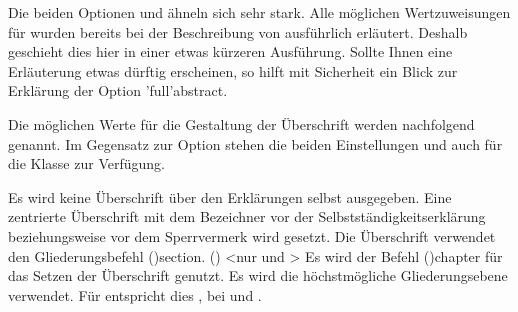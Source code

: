 \begin{DeclareEntity*}{}
\begin{DeclareEntity*}{}
\begin{DeclareEntity*}{}
\begin{Declaration}
Die beiden Optionen  und  ähneln sich sehr 
stark. Alle möglichen Wertzuweisungen für  wurden bereits 
bei der Beschreibung von  ausführlich erläutert. Deshalb 
geschieht dies hier in einer etwas kürzeren Ausführung. Sollte Ihnen eine 
Erläuterung etwas dürftig erscheinen, so hilft mit Sicherheit ein Blick zur 
Erklärung der Option \Option'full'{abstract}.

Die möglichen Werte für die Gestaltung der Überschrift werden nachfolgend 
genannt. Im Gegensatz zur Option  stehen die beiden 
Einstellungen  und  auch für 
die Klasse  zur Verfügung.
%
\begin{DeclareValues}{}
  Es wird keine Überschrift über den Erklärungen selbst ausgegeben.
  Eine zentrierte Überschrift mit dem Bezeichner  vor 
  der Selbstständigkeitserklärung beziehungsweise  vor dem 
  Sperrvermerk wird gesetzt. 
  Die Überschrift verwendet den Gliederungsbefehl 
  \Macro(){section}.
()
    <nur  und >
  Es wird der Befehl \Macro(){chapter} für das 
  Setzen der Überschrift genutzt. 
  Es wird die höchstmögliche Gliederungsebene verwendet. Für 
   entspricht dies , bei 
   und  .
\end{DeclareValues}


\end{Declaration}
\end{DeclareEntity*}
\end{DeclareEntity*}
\end{DeclareEntity*}
